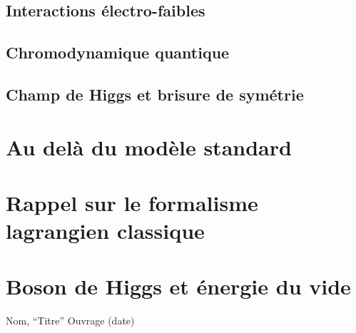 \documentclass{article}
\begin{document}
		\subsection{Interactions électro-faibles}
		
		\subsection{Chromodynamique quantique}
		
		\subsection{Champ de Higgs et brisure de symétrie}
		
		
		\section{Au delà du modèle standard}
		
		
		\begin{appendices}
			\section{Rappel sur le formalisme lagrangien classique}
			\section{Boson de Higgs et énergie du vide}
		\end{appendices}
		
		\begin{thebibliography}{4}
			Nom,
			``Titre''
			Ouvrage (date) 
			

			\end{thebibliography}
	
\end{document}
